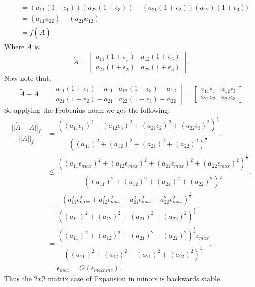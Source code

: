 \documentclass[12pt]{article}
\makeatletter
\theoremstyle{homework}
\newenvironment{exercise}[1]
{\def\@currentlabel{#1}\exercisecore}
{\endexercisecore}
\makeatother
\begin{document}
\begin{exercise}{F4}
\begin{align*}
    &= (a_{11}(1 + \epsilon_1)) (a_{22}(1 + \epsilon_3)) - (a_{21}(1 + \epsilon_2)) (a_{12})(1 + \epsilon_3))\\
    &=  (\tilde{a}_{11} \tilde{a}_{22})-(\tilde{a}_{21}\tilde{a}_{12})\\
    &= f(\tilde{A})
  \end{align*}
  Where $\tilde{A}$ is, 
  \begin{equation*}
    \tilde{A} = \begin{bmatrix}
      a_{11}(1 + \epsilon_1) & a_{12}(1 + \epsilon_3)\\
      a_{21}(1 + \epsilon_2) & a_{22}(1 + \epsilon_3)
    \end{bmatrix}.
  \end{equation*} 
  Now note that, 
  \begin{equation*}
    \tilde{A} - A = 
      \begin{bmatrix}
        a_{11}(1 + \epsilon_1) - a_{11} & a_{12}(1 + \epsilon_3) - a_{12}\\
        a_{21}(1 + \epsilon_2) - a_{21} & a_{22}(1 + \epsilon_3) - a_{22}
      \end{bmatrix}
      = 
      \begin{bmatrix}
        a_{11}\epsilon_1 & a_{12}\epsilon_3\\
        a_{21}\epsilon_2 & a_{22}\epsilon_3
      \end{bmatrix}
  \end{equation*}
  So applying the Frobenius norm we get the following, 
  \begin{align*}
    \dfrac{||\tilde{A} - A||_f}{||A||_f} &=  \dfrac{\left( (a_{11}\epsilon_1)^2 + (a_{12}\epsilon_3)^2 +(a_{21}\epsilon_2)^2 + (a_{22}\epsilon_3)^2 \right)^{\frac{1}{2}}}{   \left( (a_{11})^2 + (a_{12})^2 + (a_{21})^2 + (a_{22})^2 \right)^{\frac{1}{2}}},\\
    &\leq \dfrac{\left( (a_{11}\epsilon_{max})^2 + (a_{12}\epsilon_{max})^2 +(a_{21}\epsilon_{max})^2 + (a_{22}\epsilon_{max})^2 \right)^{\frac{1}{2}}}{   \left( (a_{11})^2 + (a_{12})^2 + (a_{21})^2 + (a_{22})^2 \right)^{\frac{1}{2}}},\\
    &= \dfrac{\left( a_{11}^2\epsilon_{max}^2 + a_{12}^2\epsilon_{max}^2 + a_{21}^2\epsilon_{max}^2 + a_{22}^2\epsilon_{max}^2 \right)^{\frac{1}{2}}} { \left( (a_{11})^2 + (a_{12})^2 + (a_{21})^2 + (a_{22})^2 \right)^{\frac{1}{2}}},\\
    &= \dfrac{\left((a_{11})^2 + (a_{12})^2 + (a_{21})^2 + (a_{22})^2 \right)^{\frac{1}{2}} \epsilon_{max}} { \left( (a_{11})^2 + (a_{12})^2 + (a_{21})^2 + (a_{22})^2 \right)^{\frac{1}{2}}},\\
    &= \epsilon_{max} = O(\epsilon_{machine}).
  \end{align*}
  Thus the $2x2$ matrix case of Expansion in minors is backwards stable.
\end{exercise}
\newpage
\end{document}
